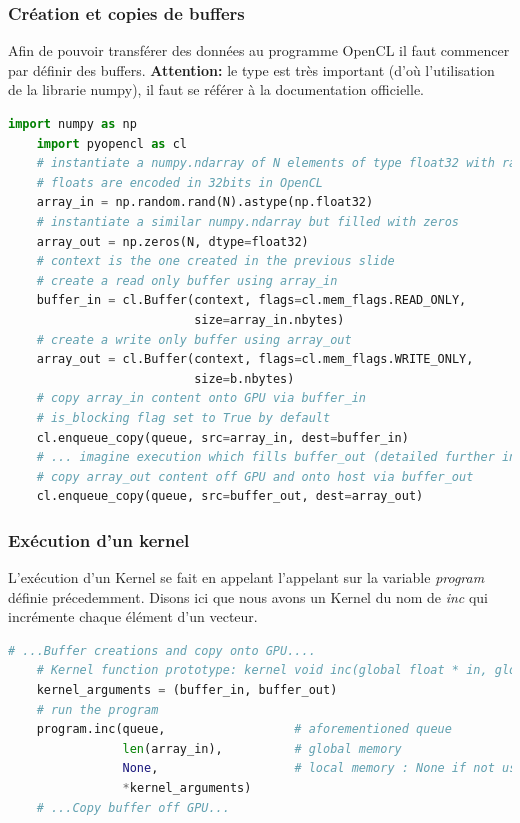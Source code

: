 \documentclass[8pt]{beamer}
\begin{document}
\begin{frame}[fragile]
    \frametitle{Création et copies de buffers}
    Afin de pouvoir transférer des données au programme OpenCL il faut 
    commencer par définir des buffers. 
    \newline
    \textbf{Attention:} le type est très important (d'où l'utilisation de la 
    librarie numpy), il faut se référer à la documentation officielle.
    \begin{lstlisting}[language=Python]
    import numpy as np
    import pyopencl as cl
    # instantiate a numpy.ndarray of N elements of type float32 with random values
    # floats are encoded in 32bits in OpenCL
    array_in = np.random.rand(N).astype(np.float32)
    # instantiate a similar numpy.ndarray but filled with zeros
    array_out = np.zeros(N, dtype=float32)
    # context is the one created in the previous slide
    # create a read only buffer using array_in
    buffer_in = cl.Buffer(context, flags=cl.mem_flags.READ_ONLY,
                          size=array_in.nbytes)
    # create a write only buffer using array_out
    array_out = cl.Buffer(context, flags=cl.mem_flags.WRITE_ONLY,
                          size=b.nbytes)
    # copy array_in content onto GPU via buffer_in
    # is_blocking flag set to True by default
    cl.enqueue_copy(queue, src=array_in, dest=buffer_in)    
    # ... imagine execution which fills buffer_out (detailed further in the slides) ...
    # copy array_out content off GPU and onto host via buffer_out
    cl.enqueue_copy(queue, src=buffer_out, dest=array_out)
    \end{lstlisting}
\end{frame}

\begin{frame}[fragile]
    \frametitle{Exécution d'un kernel}
    L'exécution d'un Kernel se fait en appelant l'appelant sur la variable 
    \textit{program} définie précedemment.
    Disons ici que nous avons un Kernel du nom de \textit{inc} qui incrémente 
    chaque élément d'un vecteur.
    \begin{lstlisting}[language=Python]
    # ...Buffer creations and copy onto GPU....
    # Kernel function prototype: kernel void inc(global float * in, global float * out)
    kernel_arguments = (buffer_in, buffer_out)
    # run the program
    program.inc(queue,                  # aforementioned queue
                len(array_in),          # global memory
                None,                   # local memory : None if not used
                *kernel_arguments)
    # ...Copy buffer off GPU...
    \end{lstlisting}
\end{frame}
\end{document}
